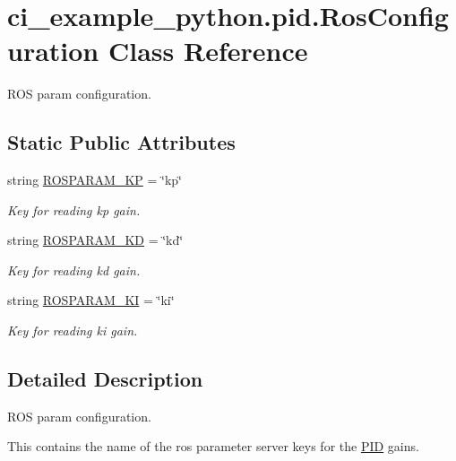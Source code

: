 \hypertarget{classci__example__python_1_1pid_1_1RosConfiguration}{}\section{ci\+\_\+example\+\_\+python.\+pid.\+Ros\+Configuration Class Reference}
\label{classci__example__python_1_1pid_1_1RosConfiguration}


R\+OS param configuration.  


\subsection*{Static Public Attributes}
\begin{DoxyCompactItemize}
\item 
string \hyperlink{classci__example__python_1_1pid_1_1RosConfiguration_a95d55922c360a7b8505c688e7c70de1d}{R\+O\+S\+P\+A\+R\+A\+M\+\_\+\+KP} = \char`\"{}kp\char`\"{}
\begin{DoxyCompactList}\small\item\em Key for reading kp gain. \end{DoxyCompactList}\item 
string \hyperlink{classci__example__python_1_1pid_1_1RosConfiguration_afe83e20beed21a38cf5138fbc4f45c35}{R\+O\+S\+P\+A\+R\+A\+M\+\_\+\+KD} = \char`\"{}kd\char`\"{}
\begin{DoxyCompactList}\small\item\em Key for reading kd gain. \end{DoxyCompactList}\item 
string \hyperlink{classci__example__python_1_1pid_1_1RosConfiguration_af9a9bff01a2434fa29788b178e0a3afe}{R\+O\+S\+P\+A\+R\+A\+M\+\_\+\+KI} = \char`\"{}ki\char`\"{}
\begin{DoxyCompactList}\small\item\em Key for reading ki gain. \end{DoxyCompactList}\end{DoxyCompactItemize}


\subsection{Detailed Description}
R\+OS param configuration. 

This contains the name of the ros parameter server keys for the \hyperlink{classci__example__python_1_1pid_1_1PID}{P\+ID} gains. 


